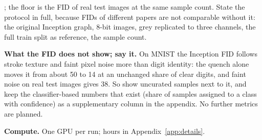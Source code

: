 \begin{plan}
        \citep{heusel2017gans}; the floor is the FID of real test images at the
        same sample count. 
        State the protocol in full, because FIDs of different papers are not
        comparable without it: the original Inception graph, 8-bit images,
        grey replicated to three channels, the full train split as reference,
        the sample count.
  \item \textbf{What the FID does not show; say it.} On MNIST the Inception
        FID follows stroke texture and faint pixel noise more than digit
        identity: the quench alone moves it from about 50 to 14 at an
        unchanged share of clear digits, and faint noise on real test images
        gives 38. So show uncurated samples next to it, and keep the
        classifier-based numbers that exist (share of samples assigned to a
        class with confidence) as a supplementary column in the appendix.
        No further metrics are planned.
  \item \textbf{Compute.} One GPU per run; hours in
        Appendix~\ref{app:details}.
\end{plan}

